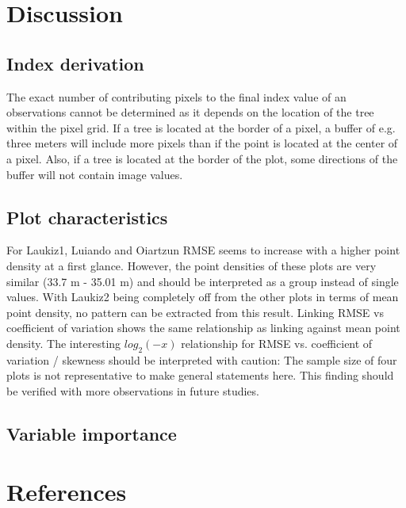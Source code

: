 \documentclass[review]{elsarticle}
\begin{document}
\section{Discussion}

\subsection{Index derivation}

The exact number of contributing pixels to the final index value of an observations cannot be determined as it depends on the location of the tree within the pixel grid.
If a tree is located at the border of a pixel, a buffer of e.g. three meters will include more pixels than if the point is located at the center of a pixel.
Also, if a tree is located at the border of the plot, some directions of the buffer will not contain image values.

\subsection{Plot characteristics}

For Laukiz1, Luiando and Oiartzun \ac{RMSE} seems to increase with a higher point density at a first glance.
However, the point densities of these plots are very similar (33.7 m - 35.01 m) and should be interpreted as a group instead of single values.
With Laukiz2 being completely off from the other plots in terms of mean point density, no pattern can be extracted from this result.
Linking RMSE vs coefficient of variation shows the same relationship as linking against mean point density.
The interesting $log_{2}(-x)$ relationship for RMSE vs. coefficient of variation / skewness should be interpreted with caution: The sample size of four plots is not representative to make general statements here.
This finding should be verified with more observations in future studies.

\subsection{Variable importance}


\section*{References}


\end{document}
